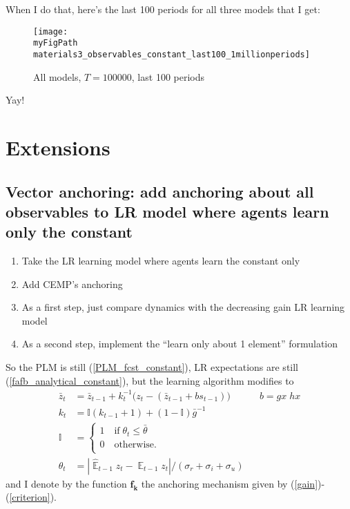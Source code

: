 \documentclass[11pt]{article}
\def \myFigPath {../figures/}
\renewcommand{\[}{\begin{equation}}
\renewcommand{\]}{\end{equation}}
\DeclareMathOperator{\E}{\mathbb{E}}
\def\myFigScale{0.3}
\begin{document}
 When I do that, here's the last 100 periods for all three models that I get:
\begin{figure}[h!]
\texttt{[image: \\myFigPath materials3\_observables\_constant\_last100\_1millionperiods]} 
\caption{All models, $T = 100000$, last 100 periods}
\end{figure}
 Yay!
 
\section{Extensions}
\subsection{Vector anchoring: add anchoring about all observables to LR model where agents learn only the constant}
 \begin{enumerate}
 \item Take the LR learning model where agents learn the constant only
 \item Add CEMP's anchoring
 \item As a first step, just compare dynamics with the decreasing gain LR learning model
 \item As a second step, implement the ``learn only about 1 element'' formulation
 \end{enumerate}

So the PLM is still (\ref{PLM_fcst_constant}), LR expectations are still (\ref{fafb_analytical_constant}), but the learning algorithm modifies to
 \begin{align}
\bar{z}_{t} & = \bar{z}_{t-1} +k_t^{-1}\big(z_{t} -(\bar{z}_{t-1}+bs_{t-1}) \big) \quad  \quad \quad b= gx\;hx \label{RLS_anchoring} \\
k_t &= \mathbb{I}(k_{t-1} +1) + (1-\mathbb{I})\bar{g}^{-1} \label{gain} \\
\mathbb{I} & = \begin{cases} 1 \quad \text{if} \; \theta_t \leq \bar{\theta}  \\ 0 \quad \text{otherwise.}\\
\end{cases} \\
\theta_t & = |\hat{\E}_{t-1}z_t - \E_{t-1}z_t| / (\sigma_r + \sigma_i + \sigma_u) \label{criterion}
\end{align}
and I denote by the function $\mathbf{f_k}$ the anchoring mechanism given by (\ref{gain})-(\ref{criterion}).
\end{document}
